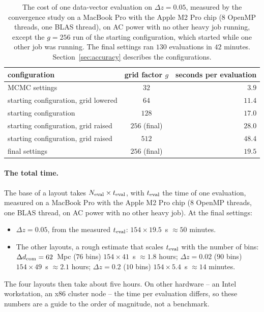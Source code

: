 \documentclass[11pt]{article}
\begin{document}
\begin{table}[tbp]
  \centering
  \begin{tabular}{lcr}
    \hline
    configuration & grid factor $g$ & seconds per evaluation \\
    \hline
    MCMC settings                 & $32$  & $3.9$ \\
    starting configuration, grid lowered & $64$  & $11.4$ \\
    starting configuration               & $128$ & $17.0$ \\
    starting configuration, grid raised  & $256$ (final) & $28.0$ \\
    starting configuration, grid raised  & $512$ & $48.4$ \\
    final settings                       & $256$ (final) & $19.5$ \\
    \hline
  \end{tabular}
  \caption{The cost of one data-vector evaluation on $\Delta z = 0.05$,
    measured by the convergence study on a MacBook Pro with the Apple
    M2 Pro chip ($8$ OpenMP threads, one BLAS thread), on AC power
    with no other heavy job
    running, except the $g = 256$ run of the starting configuration,
    which started while one
    other job was running.  The final settings ran $130$ evaluations in
    $42$ minutes.  Section~\ref{sec:accuracy} describes the
    configurations.}
  \label{tab:time}
\end{table}

\paragraph{The total time.}
The base of a layout takes $N_{\rm eval} \times t_{\rm eval}$, with
$t_{\rm eval}$ the time of one evaluation, measured on a MacBook Pro
with the Apple M2 Pro chip ($8$ OpenMP threads, one BLAS thread, on AC
power with no other heavy job).  At the final settings:
\begin{itemize}
  \item $\Delta z = 0.05$, from the measured $t_{\rm eval}$:
    $154 \times 19.5$~s $\approx 50$ minutes.
  \item The other layouts, a rough estimate that scales $t_{\rm eval}$
    with the number of bins: $\Delta d_{\rm com} = 62$~Mpc
    ($76$ bins) $154 \times 41$~s $\approx 1.8$ hours;
    $\Delta z = 0.02$ ($90$ bins) $154 \times 49$~s $\approx 2.1$ hours;
    $\Delta z = 0.2$ ($10$ bins) $154 \times 5.4$~s $\approx 14$ minutes.
\end{itemize}
The four layouts then take about five hours.  On other hardware -- an
Intel workstation, an x86 cluster node -- the time per evaluation
differs, so these numbers are a guide to the order of magnitude, not a
benchmark.
\end{document}

